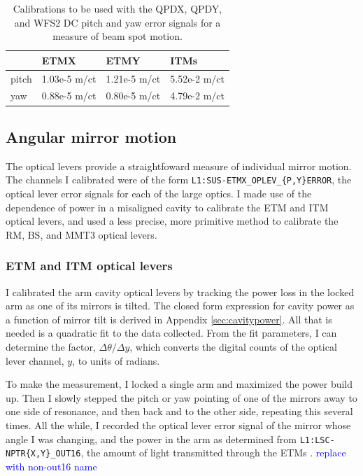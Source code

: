 \begin{table}
\centering
\begin{tabular}{l l l l}
\hline
         & ETMX & ETMY & ITMs \\
\hline
pitch & 1.03e-5 m/ct & 1.21e-5 m/ct & 5.52e-2 m/ct \\
yaw & 0.88e-5 m/ct & 0.80e-5 m/ct & 4.79e-2 m/ct \\
\hline
\end{tabular}
\caption{Calibrations to be used with the QPDX, QPDY, and WFS2 DC
  pitch and yaw error signals for a measure of beam spot motion.}
\label{table:bsmcal}
\end{table}



\subsection{Angular mirror motion}
The optical levers provide a straightfoward measure of individual
mirror motion. The channels I calibrated were of the form
\texttt{L1:SUS-ETMX\_OPLEV\_\{P,Y\}ERROR}, the optical lever error
signals for each of the large optics. I made use of the dependence of
power in a misaligned cavity to calibrate the ETM and ITM optical
levers, and used a less precise, more primitive method to calibrate
the RM, BS, and MMT3 optical levers.


\subsubsection{ETM and ITM optical levers} 
I calibrated the arm cavity optical levers by tracking the power loss
in the locked arm as one of its mirrors is tilted. The closed form
expression for cavity power as a function of mirror tilt is derived in
Appendix \ref{sec:cavitypower}. All that is needed is a quadratic fit
to the data collected. From the fit parameters, I can determine the
factor, $\Delta \theta / \Delta y$, which converts the digital counts
of the optical lever channel, $y$, to units of radians.

To make the measurement, I locked a single arm and maximized the power
build up. Then I slowly stepped the pitch or yaw pointing of one of
the mirrors away to one side of resonance, and then back and to the
other side, repeating this several times. All the while, I recorded
the optical lever error signal of the mirror whose angle I was
changing, and the power in the arm as determined from
\texttt{L1:LSC-NPTR\{X,Y\}\_OUT16}, the amount of light transmitted
through the ETMs .  \textcolor{blue}{replace with non-out16 name}

